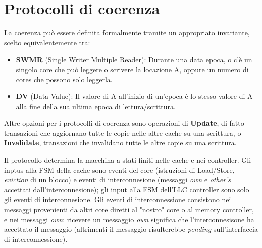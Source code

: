 \section{Protocolli di coerenza}
La coerenza può essere definita formalmente tramite un appropriato invariante, scelto equivalentemente tra:

\begin{itemize}
    \item \textbf{SWMR} (Single Writer Multiple Reader): Durante una data epoca, o c'è un singolo core che può leggere o scrivere la locazione A, oppure un numero di cores che possono solo leggerla.
    \item \textbf{DV} (Data Value): Il valore di A all'inizio di un'epoca è lo stesso valore di A alla fine della sua ultima epoca di lettura/scrittura. 
\end{itemize}

\noindent
Altre opzioni per i protocolli di coerenza sono operazioni di \textbf{Update}, di fatto transazioni che aggiornano tutte le copie nelle altre cache su una scrittura, o \textbf{Invalidate}, transazioni che invalidano tutte le altre copie su una scrittura. 

\noindent Il protocollo determina la macchina a stati finiti nelle cache e nei controller. Gli inptus alla FSM della cache sono eventi del core (istruzioni di Load/Store, \textit{eviction} di un blocco) e eventi di interconnesione (messaggi \textit{own} e \textit{other's} accettati dall'interconnesione); gli input alla FSM dell'LLC controller sono solo gli eventi di interconnesione. Gli eventi di interconnessione consistono nei messaggi provenienti da altri core diretti al "nostro" core o al memory controller, e nei messaggi \textit{own}: ricevere un messaggio \textit{own} significa che l'interconnesisone ha accettato il messaggio (altrimenti il messaggio risulterebbe \textit{pending} sull'interfaccia di interconnessione). 

\begin{figure}[ht]
    \centering
    \setlength{\fboxrule}{0.5pt} %
    \setlength{\fboxsep}{0pt}    %
\end{figure}

